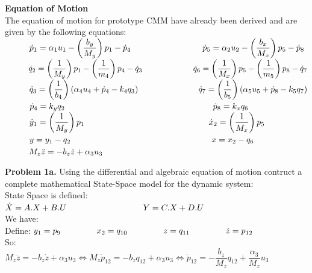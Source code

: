 \documentclass[14pt,a4paper]{article}
\begin{document}
\large\textbf{Equation of Motion}\\
	The equation of motion for prototype CMM have already been derived and are given by the following equations:\\
	\doublespacing
	$ \hspace*{1cm} \dot{p}_1 = \alpha_1u_1 - \left(\dfrac{b_y}{M_y}\right)p_1 - \dot{p}_4   \hspace{3cm}  \dot{p}_5 = \alpha_2u_2 - \left(\dfrac{b_x}{M_x}\right)p_5 - \dot{p}_8 \\$
	$ \hspace*{1cm} \dot{q}_2 = \left(\dfrac{1}{M_y}\right)p_1 - \left(\dfrac{1}{m_4}\right)p_4 - \dot{q}_3   \hspace{2.2cm}  \dot{q}_6 = \left(\dfrac{1}{M_x}\right)p_5 - \left(\dfrac{1}{m_5}\right)p_8 - \dot{q}_7 $\\
	$ \hspace*{1cm} \dot{q}_3 = \left(\dfrac{1}{b_4}\right)\left(\alpha_4u_4 + \dot{p}_4 - k_4q_3\right)    \hspace{2.5cm}  \dot{q}_7 = \left(\dfrac{1}{b_5}\right)\left(\alpha_5u_5 + \dot{p}_8 - k_5q_7\right)$\\
	$ \hspace*{1cm} \dot{p}_4 = k_yq_2    \hspace{6.2cm}  \dot{p}_8 = k_xq_6 $\\
	$ \hspace*{1cm} \dot{y}_1 = \left(\dfrac{1}{M_y}\right)p_1    \hspace{5.2cm} \dot{x}_2 = \left(\dfrac{1}{M_x}\right)p_5 $\\
	$\hspace*{1cm} y = y_1 - q_2   \hspace{5.9cm} x = x_2 - q_6 $\\
	$ \hspace*{1cm} M_z\ddot{z} = -b_z\dot{z} + \alpha_3u_3 \\$

\pagebreak

\label{Problems}
\doublespacing
\large\textbf{Problem 1a.} Using the differential and algebraic equation of motion contruct a complete mathematical State-Space model for the dynamic system: \\
	State Space is defined: \\
	\hspace*{3cm}	$\dot{X} = A.X + B.U \\
	\hspace*{3.2cm}		Y = C.X + D.U $ \\
	We have: \\
	Define: \hspace{1cm} $ y_1 = p_9 \hspace{1.5cm} x_2 = q_{10} \hspace{1.5cm}  z = q_{11} \hspace{1.5cm} \dot{z} = p_{12}$ \\
	So: \\
	$ M_z\ddot{z} = -b_z\dot{z} + \alpha_3u_3  \Leftrightarrow M_z\dot{p}_{12} = -b_zq_{12} + \alpha_3u_3 \Leftrightarrow \dot{p}_{12} = -\dfrac{b_z}{M_z}q_{12} + \dfrac{\alpha_3}{M_z}u_3 $ \\
		
\end{document}
